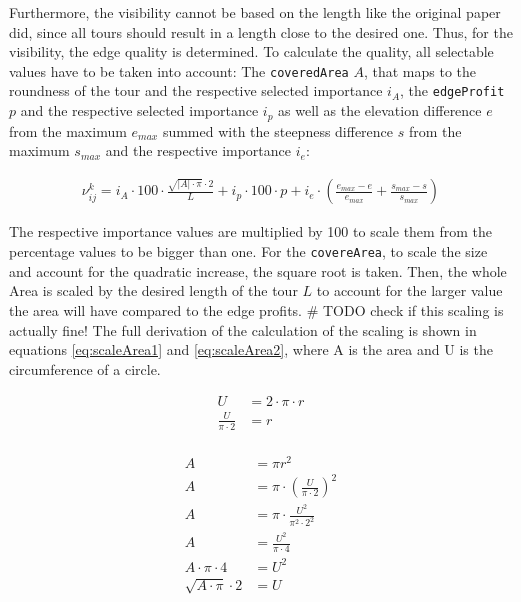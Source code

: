 Furthermore, the visibility cannot be based on the length like the original paper did, since all tours should result in a length close to the desired one.
Thus, for the visibility, the edge quality is determined.
To calculate the quality, all selectable values have to be taken into account:
The \texttt{coveredArea} $A$, that maps to the roundness of the tour and the respective selected importance $i_A$, the \texttt{edgeProfit} $p$ and the respective selected importance $i_p$ as well as the elevation difference $e$ from the maximum $e_{max}$ summed with the steepness difference $s$ from the maximum $s_{max}$ and the respective importance $i_e$:

\begin{equation}
	\label{eq:newEdgeVisibility}
	\begin{split}
	\nu_{ij}^k = i_A \cdot 100 \cdot \frac{\sqrt{|A|\cdot \pi} \cdot 2 }{L} 
	+  i_p \cdot 100 \cdot p
	+ i_e \cdot \left(\frac{e_{max} - e}{e_{max}} + \frac{s_{max} - s}{s_{max}}\right)
	\end{split}
\end{equation}

The respective importance values are multiplied by 100 to scale them from the percentage values to be bigger than one. 
For the \texttt{covereArea}, to scale the size and account for the quadratic increase, the square root is taken. 
Then, the whole Area is scaled by the desired length of the tour $L$ to account for the larger value the area will have compared to the edge profits. \# TODO check if this scaling is actually fine!
The full derivation of the calculation of the scaling is shown in equations \ref{eq:scaleArea1} and \ref{eq:scaleArea2}, where A is the area and U is the circumference of a circle.


\begin{minipage}[t][2.5cm][b]{0.4\textwidth}
	\begin{equation}
		\label{eq:scaleArea1}
		\begin{split}
			U &= 2 \cdot \pi \cdot r\\
			\frac{U}{\pi \cdot 2} &= r\\
		\end{split}
	\end{equation}
\end{minipage}
\begin{minipage}[t][2.5cm][b]{0.4\textwidth}
	\begin{equation}
		\label{eq:scaleArea2}
		\begin{split}
			A &= \pi r^2 \\
			A &= \pi \cdot \left(\frac{U}{\pi \cdot 2}\right)^2\\
			A &= \pi \cdot \frac{U^2}{\pi^2 \cdot 2^2}\\
			A &= \frac{U^2}{\pi \cdot 4}\\
			A \cdot \pi \cdot 4 &= U^2\\
			\sqrt{A \cdot \pi} \cdot 2 &= U
		\end{split}
	\end{equation}
\end{minipage}

